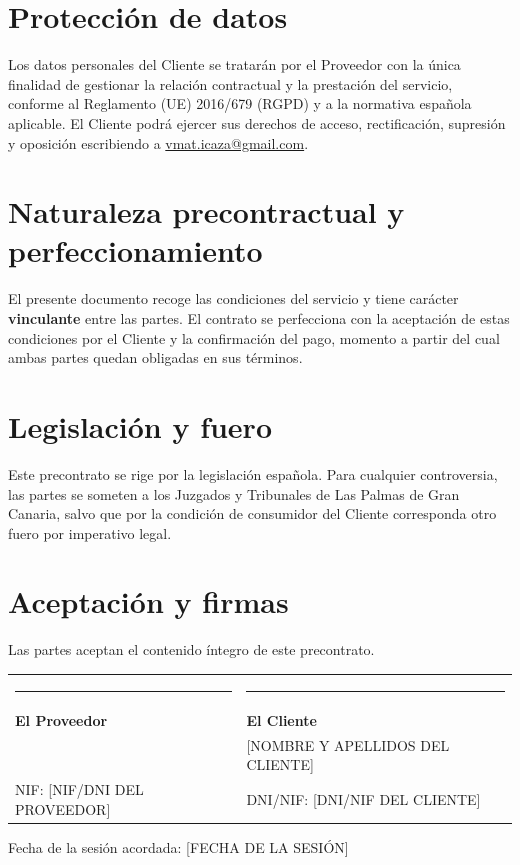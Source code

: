 \documentclass[11pt,a4paper]{article}
\makeatletter
\newcommand{\provNombre}{[NOMBRE FISCAL DEL PROVEEDOR]}
\newcommand{\provNif}{[NIF/DNI DEL PROVEEDOR]}
\newcommand{\provEmail}{vmat.icaza@gmail.com}
\newcommand{\cliNombre}{[NOMBRE Y APELLIDOS DEL CLIENTE]}
\newcommand{\cliNif}{[DNI/NIF DEL CLIENTE]}
\newcommand{\fechaSesion}{[FECHA DE LA SESIÓN]} %
\newcommand{\fieldrule}{\rule{5cm}{0.4pt}}
\makeatother
\begin{document}
\section{Protección de datos}

Los datos personales del Cliente se tratarán por el Proveedor con la única finalidad
de gestionar la relación contractual y la prestación del servicio, conforme al
Reglamento (UE) 2016/679 (RGPD) y a la normativa española aplicable. El Cliente
podrá ejercer sus derechos de acceso, rectificación, supresión y oposición
escribiendo a \href{mailto:\provEmail}{\provEmail}.

\section{Naturaleza precontractual y perfeccionamiento}

El presente documento recoge las condiciones del servicio y tiene carácter
\textbf{vinculante} entre las partes. El contrato se perfecciona con la aceptación
de estas condiciones por el Cliente y la confirmación del pago, momento a partir del
cual ambas partes quedan obligadas en sus términos.

\section{Legislación y fuero}

Este precontrato se rige por la legislación española. Para cualquier controversia,
las partes se someten a los Juzgados y Tribunales de Las Palmas de Gran Canaria,
salvo que por la condición de consumidor del Cliente corresponda otro fuero por
imperativo legal.

\vspace{1.2em}
\section*{Aceptación y firmas}

\noindent Las partes aceptan el contenido íntegro de este precontrato.

\vspace{2.2em}
\noindent
\begin{tabular}{p{} p{}}
\fieldrule & \fieldrule \\[2pt]
\textbf{El Proveedor} & \textbf{El Cliente} \\
\provNombre & \cliNombre \\
NIF: \provNif & DNI/NIF: \cliNif \\
\end{tabular}

\vspace{1.4em}
\noindent Fecha de la sesión acordada: \fechaSesion
\end{document}
